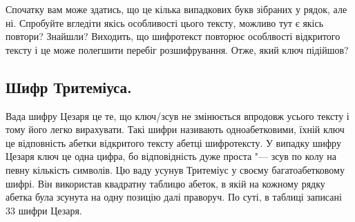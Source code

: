 \documentclass{book}
\begin{document}
Спочатку вам може здатись, що це кілька випадкових букв зібраних у рядок, але ні.
Спробуйте вгледіти якісь особливості цього тексту, можливо тут є якісь повтори?
Знайшли? Виходить, що шифротекст повторює особлвості відкритого тексту і це може
полегшити перебіг розшифрування. Отже, який ключ підійшов? 

\subsection*{Шифр Тритеміуса.}

Вада шифру Цезаря це те, що ключ/зсув не змінюється впродовж усього тексту і
тому його легко вирахувати. Такі шифри називають одноабетковими, їхній ключ це
відповність абетки відкритого тексту абетці шифротексту. У випадку шифру Цезаря
ключ це одна цифра, бо відповідність дуже проста "--- зсув по колу на певну
кількість символів. Цю ваду усунув Тритеміус у своєму багатоабетковому шифрі.
Він використав квадратну таблицю абеток, в якій на кожному рядку абетка була
зсунута на одну позицію далі праворуч. По суті, в таблиці записані 33 шифри
Цезаря.
\end{document}
